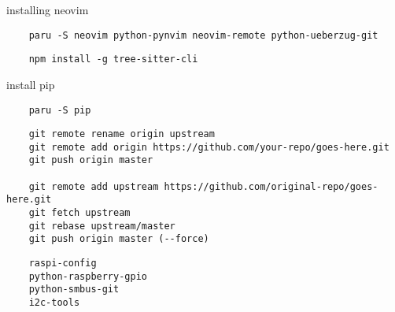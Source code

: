 \documentclass[12pt]{article}
\begin{document}
installing neovim
\begin{lstlisting}
    paru -S neovim python-pynvim neovim-remote python-ueberzug-git
\end{lstlisting}

\begin{lstlisting}
    npm install -g tree-sitter-cli
\end{lstlisting}


install pip
\begin{lstlisting}
    paru -S pip
\end{lstlisting}

\begin{lstlisting}
    git remote rename origin upstream
    git remote add origin https://github.com/your-repo/goes-here.git
    git push origin master

    git remote add upstream https://github.com/original-repo/goes-here.git
    git fetch upstream
    git rebase upstream/master
    git push origin master (--force)
\end{lstlisting}

\begin{lstlisting}
    raspi-config
    python-raspberry-gpio
    python-smbus-git
    i2c-tools
\end{lstlisting}
\end{document}
